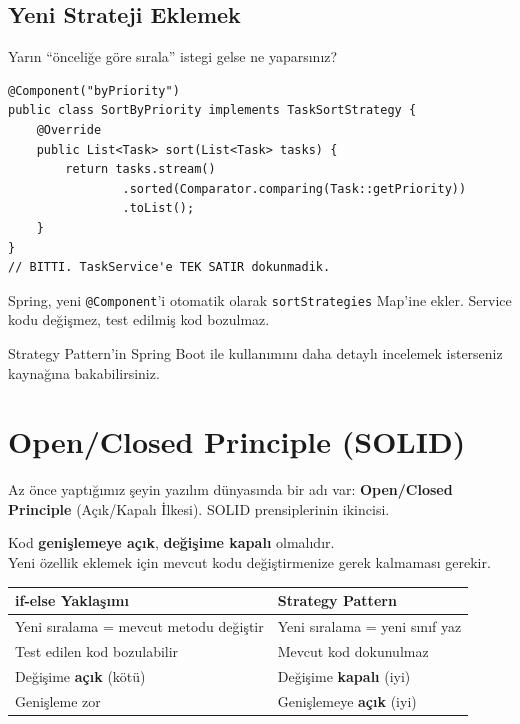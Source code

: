 \documentclass[11pt,a4paper]{article}
\begin{document}
\subsection*{Yeni Strateji Eklemek}

Yar{\i}n ``\"{o}nceli\u{g}e g\"{o}re s{\i}rala'' istegi gelse ne yapars{\i}n{\i}z?

\begin{lstlisting}[style=java]
@Component("byPriority")
public class SortByPriority implements TaskSortStrategy {
    @Override
    public List<Task> sort(List<Task> tasks) {
        return tasks.stream()
                .sorted(Comparator.comparing(Task::getPriority))
                .toList();
    }
}
// BITTI. TaskService'e TEK SATIR dokunmadik.
\end{lstlisting}

Spring, yeni \texttt{@Component}'i otomatik olarak \texttt{sortStrategies} Map'ine ekler. Service kodu de\u{g}i\c{s}mez, test edilmi\c{s} kod bozulmaz.

Strategy Pattern'in Spring Boot ile kullan{\i}m{\i}n{\i} daha detayl{\i} incelemek isterseniz \cite{strategy-spring-boot} kayna\u{g}{\i}na bakabilirsiniz.

\newpage

\section{Open/Closed Principle (SOLID)}

Az \"{o}nce yapt{\i}\u{g}{\i}m{\i}z \c{s}eyin yaz{\i}l{\i}m d\"{u}nyas{\i}nda bir ad{\i} var: \textbf{Open/Closed Principle} (A\c{c}{\i}k/Kapal{\i} \.{I}lkesi). SOLID prensiplerinin ikincisi.

\begin{infobox}[title={\textbf{Open/Closed Principle}}]
Kod \textbf{geni\c{s}lemeye a\c{c}{\i}k}, \textbf{de\u{g}i\c{s}ime kapal{\i}} olmal{\i}d{\i}r.\\[0.3cm]
Yeni \"{o}zellik eklemek i\c{c}in mevcut kodu de\u{g}i\c{s}tirmenize gerek kalmamas{\i} gerekir.
\end{infobox}

\begin{center}
\begin{tabular}{p{6cm}p{6.5cm}}
\toprule
\textbf{if-else Yakla\c{s}{\i}m{\i}} & \textbf{Strategy Pattern} \\
\midrule
Yeni s{\i}ralama = mevcut metodu de\u{g}i\c{s}tir & Yeni s{\i}ralama = yeni s{\i}n{\i}f yaz \\
Test edilen kod bozulabilir & Mevcut kod dokunulmaz \\
De\u{g}i\c{s}ime \textbf{a\c{c}{\i}k} (k\"{o}t\"{u}) & De\u{g}i\c{s}ime \textbf{kapal{\i}} (iyi) \\
Geni\c{s}leme zor & Geni\c{s}lemeye \textbf{a\c{c}{\i}k} (iyi) \\
\bottomrule
\end{tabular}
\end{center}
\end{document}
